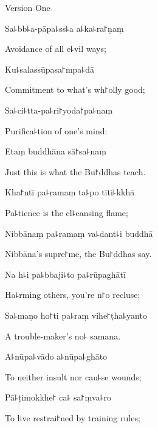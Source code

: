 \begin{instruction}
  Version One
\end{instruction}

Sa꜕bb꜕a-pāpa꜕ss꜕a a꜕ka꜕ra꜓ṇaṃ

\begin{english}
  Avoidance of all e꜕vil ways;
\end{english}

Ku꜕salassūpasa꜓mpa꜕dā

\begin{english}
  Commitment to what's wh꜓olly good;
\end{english}

Sa꜕ci꜕tta-pa꜕ri꜓yoda꜓pa꜕naṃ

\begin{english}
  Purifica꜕tion of one's mind:
\end{english}

Etaṃ buddhāna sā꜓sa꜕naṃ

\begin{english}
  Just this is what the Bu꜓ddhas teach.
\end{english}

Kha꜓ntī pa꜕ramaṃ ta꜕po tīti꜕kkhā

\begin{english}
  Pa꜕tience is the cl꜕eansing flame;
\end{english}

Nibbānaṃ pa꜕ramaṃ va꜕dant꜕i buddhā

\begin{english}
  Nibbāna's supre꜓me, the Bu꜓ddhas say.
\end{english}

Na h꜕i pa꜕bbaji꜕to pa꜕rūpaghātī

\begin{english}
  Ha꜕rming others, you're n꜓o recluse;
\end{english}

Sa꜕maṇo ho꜓ti pa꜕raṃ vihe꜓ṭha꜕yanto

\begin{english}
  A trouble-maker's no꜕ samana.
\end{english}

A꜕nūpa꜕vādo a꜕nūpa꜕ghāto

\begin{english}
  To neither insult nor cau꜕se wounds;
\end{english}

Pā꜕ṭimokkhe꜓ ca꜕ sa꜓ṃva꜕ro

\begin{english}
  To live restrai꜓ned by training rules;
\end{english}

